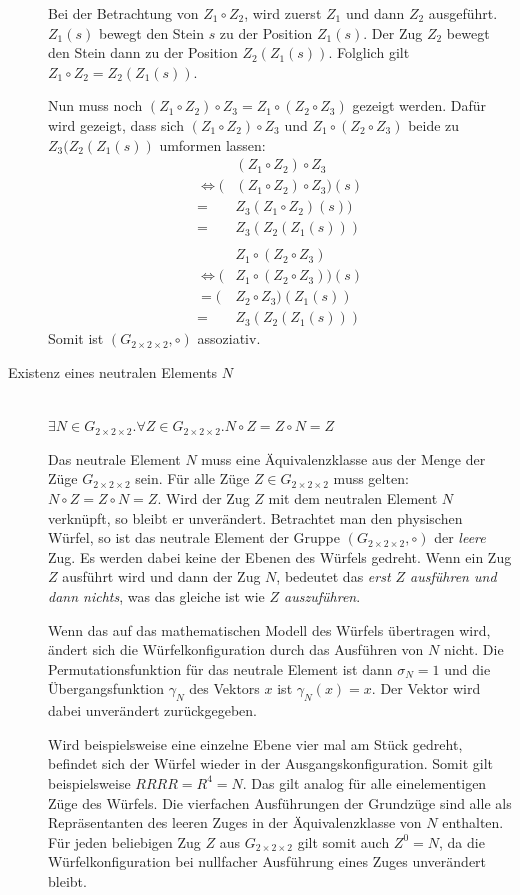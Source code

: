 \documentclass[12pt,a4paper, usenames, dvipsnames]{article}
\theoremstyle{mystyle}
\theoremstyle{definition}
\newcommand{\Gtwo}{\ensuremath{G_{2\times 2\times 2}}}
\begin{document}
\begin{description}
Bei der Betrachtung von $Z_1 \circ Z_2 $, wird zuerst $Z_1$ und dann $Z_2$ ausgeführt. $Z_1(s)$ bewegt den Stein $s$ zu der Position $Z_1(s)$. Der Zug $Z_2$ bewegt den Stein dann zu der Position $Z_2(Z_1(s))$. Folglich gilt $Z_1 \circ Z_2 = Z_2(Z_1(s))$. 


Nun muss noch $(Z_1 \circ Z_2) \circ Z_3 = Z_1 \circ (Z_2 \circ Z_3)$ gezeigt werden. Dafür wird gezeigt, dass sich $(Z_1 \circ Z_2) \circ Z_3$ und $Z_1 \circ (Z_2 \circ Z_3)$ beide zu $Z_3(Z_2(Z_1(s))$ umformen lassen: 
\begin{align*}
& (Z_1 \circ Z_2) \circ Z_3  \\
\Leftrightarrow (&(Z_1 \circ Z_2) \circ Z_3)(s) \\
= & Z_3(Z_1 \circ Z_2)(s)) \\
= & Z_3(Z_2(Z_1(s)))  
\\
\\
&Z_1 \circ (Z_2 \circ Z_3) \\
\Leftrightarrow (&Z_1 \circ (Z_2 \circ Z_3))(s) \\
= (&Z_2 \circ Z_3)(Z_1(s)) \\
= \ \ & Z_3(Z_2(Z_1(s)))  
\end{align*}
Somit ist $(\Gtwo, \circ)$ assoziativ.

\item [Existenz eines neutralen Elements $N$] \ \\
$\exists N \in \Gtwo. \forall Z \in \Gtwo .N \circ Z = Z \circ N = Z$ 


Das neutrale Element $N$ muss eine Äquivalenzklasse aus der Menge der Züge $\Gtwo$ sein. Für alle Züge $Z \in \Gtwo$ muss gelten: $N \circ Z = Z \circ N = Z$. Wird der Zug $Z$ mit dem neutralen Element $N$ verknüpft, so bleibt er unverändert. Betrachtet man den physischen Würfel, so ist das neutrale Element der Gruppe $(\Gtwo, \circ)$ der \textit{leere} Zug. Es werden dabei keine der Ebenen des Würfels gedreht. Wenn ein Zug $Z$ ausführt wird und dann der Zug $N$, bedeutet das \textit{erst $Z$ ausführen und dann nichts}, was das gleiche ist wie \textit{$Z$ auszuführen}. 

Wenn das auf das mathematischen Modell des Würfels übertragen wird, ändert sich die Würfelkonfiguration durch das Ausführen von $N$ nicht. Die Permutationsfunktion für das  neutrale Element ist dann $\sigma_N=1$ und die Übergangsfunktion $\gamma_N$ des Vektors $x$ ist $\gamma_N(x)=x$. Der Vektor wird dabei unverändert zurückgegeben.


Wird beispielsweise eine einzelne Ebene vier mal am Stück gedreht, befindet sich der Würfel wieder in der Ausgangskonfiguration. Somit gilt beispielsweise $RRRR=R^4=N$. Das gilt analog für alle einelementigen Züge des Würfels.
Die vierfachen Ausführungen der Grundzüge sind alle als Repräsentanten des leeren Zuges in der Äquivalenzklasse von $N$ enthalten.
Für jeden beliebigen Zug $Z$ aus $\Gtwo$ gilt somit auch $Z^0=N$, da die Würfelkonfiguration bei nullfacher Ausführung eines Zuges unverändert bleibt.


\end{description}
\end{document}
